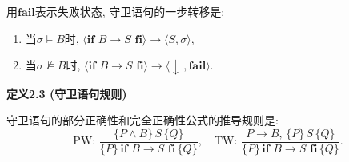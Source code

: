 \documentclass[UTF8]{ctexart}
\begin{document}
用$\textbf{fail}$表示失败状态, 守卫语句的一步转移是:
\begin{enumerate}
    \item 当$\sigma\models B$时, $\langle\mathbf{if}\,\,B\to S
    \,\,\mathbf{fi}\rangle\to\langle S,\sigma\rangle$,
    \item 当$\sigma\not\models B$时, $\langle\mathbf{if}\,\,B\to S
    \,\,\mathbf{fi}\rangle\to\langle\downarrow\,,\textbf{fail}\rangle$.
\end{enumerate}

\vspace{10pt}

\hypertarget{sec:定义2.3}{}
\noindent\textbf{定义2.3 (守卫语句规则)}

守卫语句的部分正确性和完全正确性公式的推导规则是:
\vspace{5pt}
\[
    \mathrm{PW}:\,\frac{\{P\land B\}\,S\,\{Q\}}
    {\{P\}\,\mathbf{if}\,\,B\to S\,\,\mathbf{fi}\,\{Q\}},\quad
    \mathrm{TW}:\,\frac{P\to B,\,\{P\}\,S\,\{Q\}}
    {\{P\}\,\mathbf{if}\,\,B\to S\,\,\mathbf{fi}\,\{Q\}}.
\]
\end{document}
